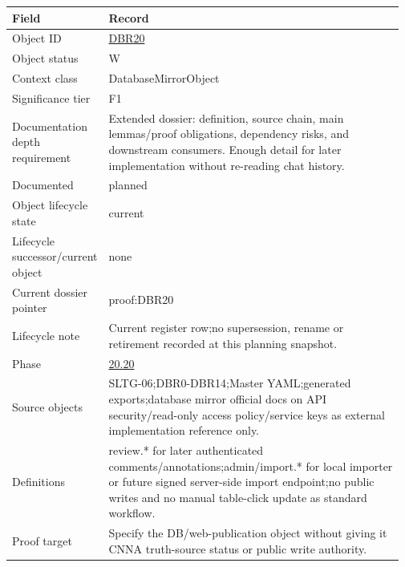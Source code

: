 \begin{longtable}{L{0.16\linewidth} L{0.81\linewidth}}
\hline
\textbf{Field} & \textbf{Record}\\
\hline
Object ID & \hyperlink{object-row-DBR20}{DBR20}\\
\hline\addlinespace[0.20em]
Object status & W\\
\hline\addlinespace[0.20em]
Context class & DatabaseMirrorObject\\
\hline\addlinespace[0.20em]
Significance tier & F1\\
\hline\addlinespace[0.20em]
Documentation depth requirement & Extended dossier: definition, source chain, main lemmas/\allowbreak{}proof obligations, dependency risks, and downstream consumers. Enough detail for later implementation without re-reading chat history.\\
\hline\addlinespace[0.20em]
Documented & planned\\
\hline\addlinespace[0.20em]
Object lifecycle state & current\\
\hline\addlinespace[0.20em]
Lifecycle successor/\allowbreak{}current object & none\\
\hline\addlinespace[0.20em]
Current dossier pointer & proof:DBR20\\
\hline\addlinespace[0.20em]
Lifecycle note & Current register row;\newline no supersession, rename or retirement recorded at this planning snapshot.\\
\hline\addlinespace[0.20em]
Phase & \hyperlink{phase-row-20-20}{20.20}\\
\hline\addlinespace[0.20em]
Source objects & SLTG-06;\newline DBR0-DBR14;\newline Master YAML;\newline generated exports;\newline database mirror official docs on API security/\allowbreak{}read-only access policy/\allowbreak{}service keys as external implementation reference only.\\
\hline\addlinespace[0.20em]
Definitions & review.* for later authenticated comments/\allowbreak{}annotations;\newline admin/\allowbreak{}import.* for local importer or future signed server-side import endpoint;\newline no public writes and no manual table-click update as standard workflow.\\
\hline\addlinespace[0.20em]
Proof target & Specify the DB/\allowbreak{}web-publication object without giving it CNNA truth-source status or public write authority.\\

\end{longtable}
